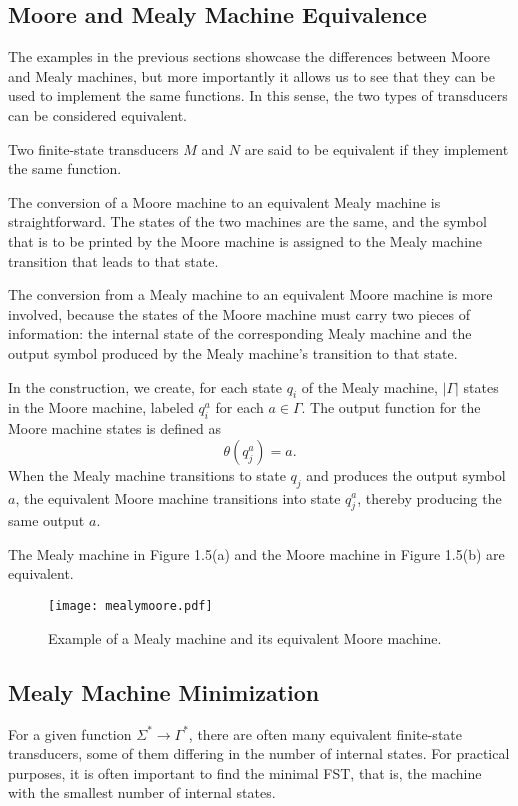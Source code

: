 \subsection{Moore and Mealy Machine Equivalence}

The examples in the previous sections showcase the differences between Moore and Mealy machines, 
but more importantly it allows us to see that they can be used to implement the same functions.
In this sense, the two types of transducers can be considered equivalent.

Two finite-state transducers \(M\) and \(N\) are said to be equivalent if they implement the same function.\cite{linz2011formal}

The conversion of a Moore machine to an equivalent Mealy machine is straightforward. The
states of the two machines are the same, and the symbol that is to be printed by the Moore machine is
assigned to the Mealy machine transition that leads to that state.

The conversion from a Mealy machine to an equivalent Moore machine is more involved, 
because the states of the Moore machine must carry two pieces of information: 
the internal state of the corresponding Mealy machine and the output symbol produced by the Mealy machine's transition to that state.

In the construction, we create, for each state \( q_i \) of the Mealy machine, \(|\Gamma|\) states in the Moore machine, 
labeled \( q_{i}^{a} \) for each \( a \in \Gamma \). The output function for the Moore machine states is defined as
\[
\theta(q_{j}^{a}) = a.
\]
When the Mealy machine transitions to state \( q_j \) and produces the output symbol \( a \), 
the equivalent Moore machine transitions into state \( q_{j}^{a} \), thereby producing the same output \( a \).

The Mealy machine in Figure 1.5(a) and the Moore machine in Figure 1.5(b) are equivalent.

\begin{figure}[H]
    \centering
    \texttt{[image: mealymoore.pdf]}
    \caption{Example of a Mealy machine and its equivalent Moore machine.}
    \label{fig:5}
\end{figure}

\subsection{Mealy Machine Minimization}

For a given function \(\Sigma^* \rightarrow \Gamma^*\), there are often many equivalent finite-state transducers, 
some of them differing in the number of internal states. For practical purposes, it is often important to find the
minimal FST, that is, the machine with the smallest number of internal states.

